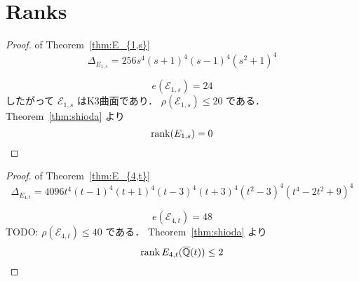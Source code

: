 \documentclass[main]{subfiles}
\begin{document}
\chapter{Ranks}

\begin{proof}{of Theorem~\ref{thm:E_{1,s}}}
    \begin{equation}
        \Delta_{E_{1,s}} = 256s^{4} (s + 1)^{4} (s - 1)^{4} (s^{2} + 1)^{4}
    \end{equation}

    \begin{equation}
        e(\mathcal{E}_{1,s}) = 24
    \end{equation}
    したがって $\mathcal{E}_{1,s}$ はK3曲面であり． $\rho(\mathcal{E}_{1,s}) \leq 20$ である．
    Theorem~\ref{thm:shioda} より
    \begin{equation}
        \operatorname{rank}(E_{1,s}) = 0
    \end{equation}
\end{proof}

\begin{proof}{of Theorem~\ref{thm:E_{4,t}}}
    \begin{equation}
        \Delta_{E_{4,t}} = 4096t^{4}(t - 1)^{4}(t + 1)^{4}(t - 3)^{4}(t + 3)^{4}(t^{2} - 3)^{4}(t^{4} - 2t^{2} + 9)^{4}
    \end{equation}

    \begin{equation}
        e(\mathcal{E}_{4,t}) = 48
    \end{equation}
    TODO: $\rho(\mathcal{E}_{4,t}) \leq 40$ である．
    Theorem~\ref{thm:shioda} より
    \begin{equation}
        \operatorname{rank} E_{4,t}(\overline{\mathbb{Q}}(t)) \leq 2
    \end{equation}
\end{proof}
\end{document}
